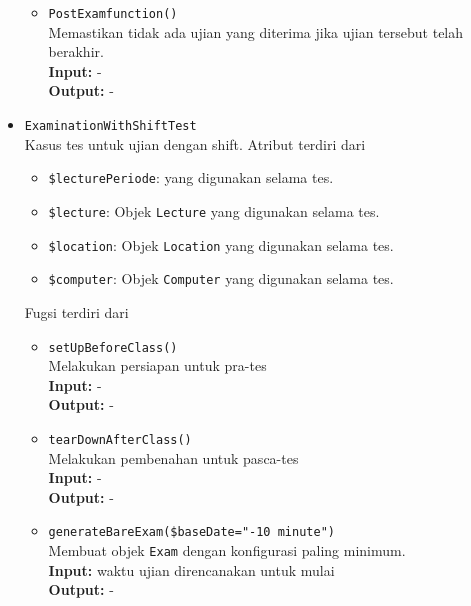 \begin{itemize}
\begin{itemize}
                    \item \texttt{PostExamfunction()} \\
                        Memastikan tidak ada ujian yang diterima jika ujian tersebut telah berakhir. \\
                        \textbf{Input:} - \\
                        \textbf{Output:} -
                \end{itemize}
                
            \item \texttt{ExaminationWithShiftTest} \\
                Kasus tes untuk ujian dengan shift.
                Atribut terdiri dari
                \begin{itemize}
                    \item \texttt{\$lecturePeriode}:  yang digunakan selama tes.
                    \item \texttt{\$lecture}: Objek \texttt{Lecture} yang digunakan selama tes.
                    \item \texttt{\$location}: Objek \texttt{Location} yang digunakan selama tes.
                    \item \texttt{\$computer}: Objek \texttt{Computer} yang digunakan selama tes.
                \end{itemize}
                Fugsi terdiri dari
                \begin{itemize}
                    \item \texttt{setUpBeforeClass()} \\
                        Melakukan persiapan untuk pra-tes \\
                        \textbf{Input:} -\\
                        \textbf{Output:} -
                    
                    \item \texttt{tearDownAfterClass()} \\
                        Melakukan pembenahan untuk pasca-tes \\
                        \textbf{Input:} -\\
                        \textbf{Output:} -
                    
                    \item \texttt{generateBareExam(\$baseDate="-10 minute")} \\
                        Membuat objek \texttt{Exam} dengan konfigurasi paling minimum. \\
                        \textbf{Input:} waktu ujian direncanakan untuk mulai\\
                        \textbf{Output:} -
                    

\end{itemize}
\end{itemize}
